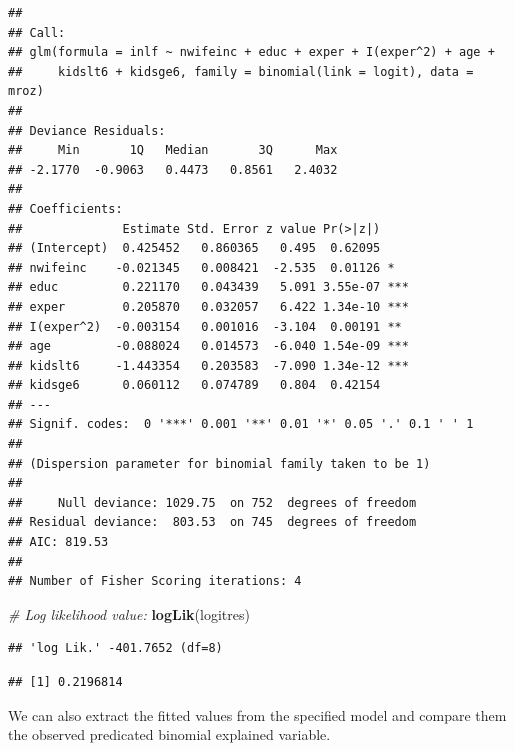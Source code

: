 \documentclass[]{book}
\newenvironment{Shaded}{\begin{snugshade}}{\end{snugshade}}
\newcommand{\CommentTok}[1]{\textcolor[rgb]{0.56,0.35,0.01}{\textit{#1}}}
\newcommand{\DecValTok}[1]{\textcolor[rgb]{0.00,0.00,0.81}{#1}}
\newcommand{\KeywordTok}[1]{\textcolor[rgb]{0.13,0.29,0.53}{\textbf{#1}}}
\newcommand{\NormalTok}[1]{#1}
\newcommand{\OperatorTok}[1]{\textcolor[rgb]{0.81,0.36,0.00}{\textbf{#1}}}
\newcommand{\StringTok}[1]{\textcolor[rgb]{0.31,0.60,0.02}{#1}}
\begin{document}
\begin{verbatim}
## 
## Call:
## glm(formula = inlf ~ nwifeinc + educ + exper + I(exper^2) + age + 
##     kidslt6 + kidsge6, family = binomial(link = logit), data = mroz)
## 
## Deviance Residuals: 
##     Min       1Q   Median       3Q      Max  
## -2.1770  -0.9063   0.4473   0.8561   2.4032  
## 
## Coefficients:
##              Estimate Std. Error z value Pr(>|z|)    
## (Intercept)  0.425452   0.860365   0.495  0.62095    
## nwifeinc    -0.021345   0.008421  -2.535  0.01126 *  
## educ         0.221170   0.043439   5.091 3.55e-07 ***
## exper        0.205870   0.032057   6.422 1.34e-10 ***
## I(exper^2)  -0.003154   0.001016  -3.104  0.00191 ** 
## age         -0.088024   0.014573  -6.040 1.54e-09 ***
## kidslt6     -1.443354   0.203583  -7.090 1.34e-12 ***
## kidsge6      0.060112   0.074789   0.804  0.42154    
## ---
## Signif. codes:  0 '***' 0.001 '**' 0.01 '*' 0.05 '.' 0.1 ' ' 1
## 
## (Dispersion parameter for binomial family taken to be 1)
## 
##     Null deviance: 1029.75  on 752  degrees of freedom
## Residual deviance:  803.53  on 745  degrees of freedom
## AIC: 819.53
## 
## Number of Fisher Scoring iterations: 4
\end{verbatim}

\begin{Shaded}
\begin{Highlighting}[]
\CommentTok{# Log likelihood value:}
\KeywordTok{logLik}\NormalTok{(logitres) }
\end{Highlighting}
\end{Shaded}

\begin{verbatim}
## 'log Lik.' -401.7652 (df=8)
\end{verbatim}

\begin{Shaded}
\end{Shaded}

\begin{verbatim}
## [1] 0.2196814
\end{verbatim}

We can also extract the fitted values from the specified model and compare them the observed predicated binomial explained variable.
\end{document}
